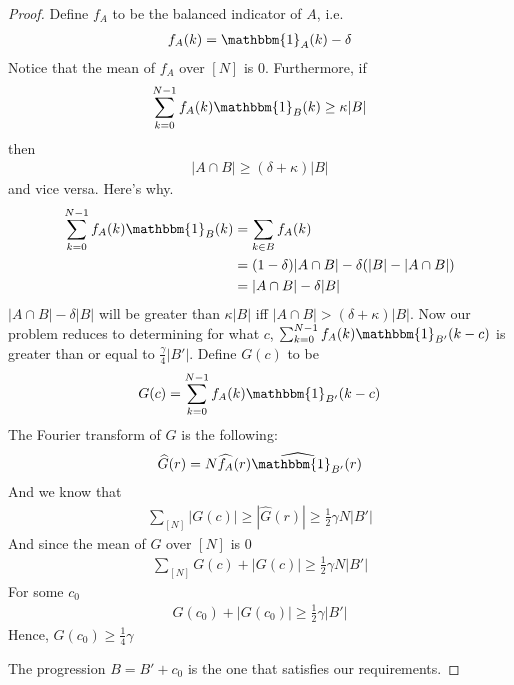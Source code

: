 \documentclass[12pt, titlepage]{article}
\theoremstyle{definition}
\newcommand{\indi}{\mathbbm{1}}
\begin{document}
\begin{proof}
    Define $f_A$ to be the balanced indicator of $A$, i.e.
    \begin{align*}
        f_A(k) = \indi_A(k) - \delta
    \end{align*}
    Notice that the mean of $f_A$ over $[N]$ is $0$. Furthermore, if 
    \begin{align*} 
        \sum_{k=0}^{N-1} f_A(k) \indi_B(k) \geq \kappa |B|
    \end{align*}
    then
    \begin{align*}
        |A \cap B| \geq \left( \delta + \kappa \right)|B|
    \end{align*}
    and vice versa. Here's why.
    \begin{align*}
        \sum_{k=0}^{N-1} f_A(k) \indi_B(k) &= \sum_{k \in B} f_A(k) \\
        &= (1-\delta)|A \cap B| - \delta (|B| - |A \cap B|) \\
        &= |A \cap B| - \delta |B| 
    \end{align*}
    $|A \cap B| - \delta|B|$ will be greater than $\kappa |B|$ iff $|A \cap B| > (\delta + \kappa)|B|$. Now our problem reduces to determining for what $c$, $\sum_{k=0}^{N-1} f_A(k) \indi_{B'}(k-c)$ is greater than or equal to $\frac{\gamma}{4} |B'|$. Define $G(c)$ to be
    \begin{align*}
        G(c) = \sum_{k=0}^{N-1} f_A(k) \indi_{B'}(k-c)
    \end{align*}
    The Fourier transform of $G$ is the following:
    \begin{align*}
        \widehat{G}(r) = N \widehat{f_A}(r) \widehat{\indi_{B'}}(r)
    \end{align*}
    And we know that
    \begin{align*}
        \sum_{[N]} |G(c)| \geq \left| \widehat{G}(r) \right| \geq \frac{1}{2}\gamma N |B'|
    \end{align*}
    And since the mean of $G$ over $[N]$ is $0$
    \begin{align*}
        \sum_{[N]} G(c) + |G(c)| \geq \frac{1}{2}\gamma N |B'|
    \end{align*}
    For some $c_0$
    \begin{align*}
        G(c_0) + |G(c_0)| \geq \frac{1}{2} \gamma |B'|
    \end{align*}
    Hence, $G(c_0) \geq \frac{1}{4}\gamma$
    
    The progression $B = B' + c_0$ is the one that satisfies our requirements.
\end{proof}
\end{document}
